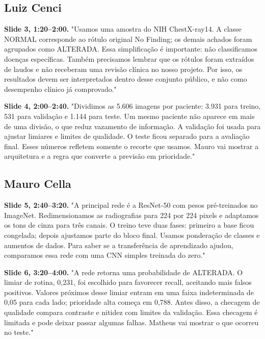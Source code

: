 \documentclass[11pt,a4paper]{article}
\begin{document}
\subsection*{Luiz Cenci}

\textbf{Slide 3, 1:20--2:00.} "Usamos uma amostra do NIH ChestX-ray14. A classe NORMAL corresponde ao rótulo original No Finding; os demais achados foram agrupados como ALTERADA. Essa simplificação é importante: não classificamos doenças específicas. Também precisamos lembrar que os rótulos foram extraídos de laudos e não receberam uma revisão clínica no nosso projeto. Por isso, os resultados devem ser interpretados dentro desse conjunto público, e não como desempenho clínico já comprovado."\par

\textbf{Slide 4, 2:00--2:40.} "Dividimos as 5.606 imagens por paciente: 3.931 para treino, 531 para validação e 1.144 para teste. Um mesmo paciente não aparece em mais de uma divisão, o que reduz vazamento de informação. A validação foi usada para ajustar limiares e limites de qualidade. O teste ficou separado para a avaliação final. Esses números refletem somente o recorte que usamos. Mauro vai mostrar a arquitetura e a regra que converte a previsão em prioridade."\par

\subsection*{Mauro Cella}

\textbf{Slide 5, 2:40--3:20.} "A principal rede é a ResNet-50 com pesos pré-treinados no ImageNet. Redimensionamos as radiografias para 224 por 224 pixels e adaptamos os tons de cinza para três canais. O treino teve duas fases: primeiro a base ficou congelada; depois ajustamos parte do bloco final. Usamos ponderação de classes e aumentos de dados. Para saber se a transferência de aprendizado ajudou, comparamos essa rede com uma CNN simples treinada do zero."\par

\textbf{Slide 6, 3:20--4:00.} "A rede retorna uma probabilidade de ALTERADA. O limiar de rotina, 0,231, foi escolhido para favorecer recall, aceitando mais falsos positivos. Valores próximos desse limiar entram em uma faixa indeterminada de 0,05 para cada lado; prioridade alta começa em 0,788. Antes disso, a checagem de qualidade compara contraste e nitidez com limites da validação. Essa checagem é limitada e pode deixar passar algumas falhas. Matheus vai mostrar o que ocorreu no teste."\par
\end{document}
